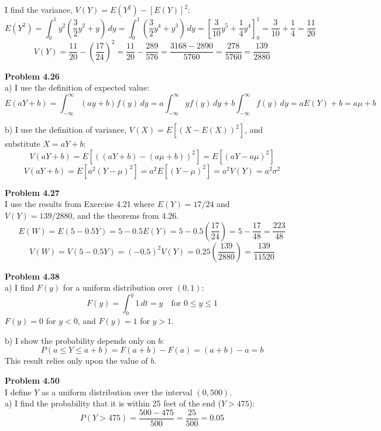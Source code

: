 \documentclass[11pt]{article}
\begin{document}
\noindent I find the variance, $V(Y) = E(Y^2) - [E(Y)]^2$:
\[ E(Y^2) = \int_{0}^{1} y^2 \left( \frac{3}{2}y^2 + y \right) \, dy = \int_{0}^{1} \left( \frac{3}{2}y^4 + y^3 \right) \, dy = \left[ \frac{3}{10}y^5 + \frac{1}{4}y^4 \right]_0^1 = \frac{3}{10} + \frac{1}{4} = \frac{11}{20} \]
\[ V(Y) = \frac{11}{20} - \left(\frac{17}{24}\right)^2 = \frac{11}{20} - \frac{289}{576} = \frac{3168 - 2890}{5760} = \frac{278}{5760} = \frac{139}{2880} \]

\vspace{0.5cm}
\noindent \textbf{Problem 4.26} \\
a) I use the definition of expected value:
\[ E(aY + b) = \int_{-\infty}^{\infty} (ay + b)f(y) \, dy = a\int_{-\infty}^{\infty} y f(y) \, dy + b\int_{-\infty}^{\infty} f(y) \, dy = aE(Y) + b = a\mu + b \]

\noindent b) I use the definition of variance, $V(X) = E[(X - E(X))^2]$, and substitute $X = aY + b$:
\[ V(aY + b) = E[((aY + b) - (a\mu + b))^2] = E[(aY - a\mu)^2] \]
\[ V(aY + b) = E[a^2(Y - \mu)^2] = a^2 E[(Y - \mu)^2] = a^2 V(Y) = a^2 \sigma^2 \]

\vspace{0.5cm}
\noindent \textbf{Problem 4.27} \\
I use the results from Exercise 4.21 where $E(Y) = 17/24$ and $V(Y) = 139/2880$, and the theorems from 4.26.
\[ E(W) = E(5 - 0.5Y) = 5 - 0.5E(Y) = 5 - 0.5\left(\frac{17}{24}\right) = 5 - \frac{17}{48} = \frac{223}{48} \]
\[ V(W) = V(5 - 0.5Y) = (-0.5)^2 V(Y) = 0.25\left(\frac{139}{2880}\right) = \frac{139}{11520} \]

\vspace{0.5cm}
\noindent \textbf{Problem 4.38} \\
a) I find $F(y)$ for a uniform distribution over $(0, 1)$:
\[ F(y) = \int_{0}^{y} 1 \, dt = y \quad \text{for } 0 \le y \le 1 \]
$F(y) = 0$ for $y < 0$, and $F(y) = 1$ for $y > 1$.

\noindent b) I show the probability depends only on $b$:
\[ P(a \le Y \le a + b) = F(a + b) - F(a) = (a + b) - a = b \]
This result relies only upon the value of $b$.

\vspace{0.5cm}
\noindent \textbf{Problem 4.50} \\
I define $Y$ as a uniform distribution over the interval $(0, 500)$.
\\
a) I find the probability that it is within 25 feet of the end ($Y > 475$):
\[ P(Y > 475) = \frac{500 - 475}{500} = \frac{25}{500} = 0.05 \]
\end{document}
